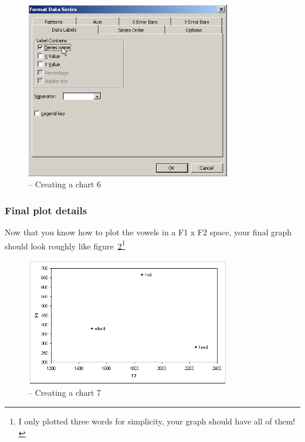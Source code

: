 \begin{figure}[!tbp]
\caption{\MSExcel{} -- Creating a chart 6}
\label{step5plot}
	\begin{center}
		\includegraphics[width=0.8\textwidth]{./figures/ExcelPlot6}
	\end{center}
\end{figure}

\subsubsection{Final plot details}

Now that you know how to plot the vowels in a F1 x F2 space, your final graph should look roughly like figure~\ref{step6plot}\footnote{I only plotted three words for simplicity, your graph should have all of them!}

\begin{figure}[!tbp]
\caption{\MSExcel{} -- Creating a chart 7}
\label{step6plot}
	\begin{center}
		\includegraphics[width=0.8\textwidth]{./figures/ExcelPlot7}
	\end{center}
\end{figure}

